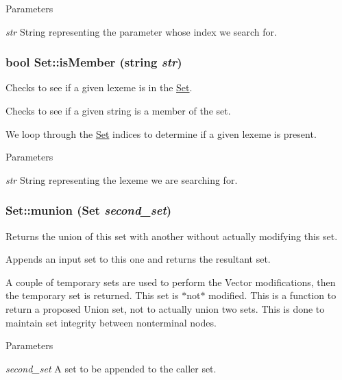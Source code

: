 \begin{DoxyParams}{Parameters}
\item[{\em str}]String representing the parameter whose index we search for. \end{DoxyParams}
\hypertarget{classSet_a4f539b8baf5e31d8c79cae9381a9e8be}{
\subsubsection[{isMember}]{\setlength{\rightskip}{0pt plus 5cm}bool Set::isMember (string {\em str})}}
\label{classSet_a4f539b8baf5e31d8c79cae9381a9e8be}


Checks to see if a given lexeme is in the \hyperlink{classSet}{Set}. 

Checks to see if a given string is a member of the set.

We loop through the \hyperlink{classSet}{Set} indices to determine if a given lexeme is present.


\begin{DoxyParams}{Parameters}
\item[{\em str}]String representing the lexeme we are searching for. \end{DoxyParams}
\hypertarget{classSet_ad28bf0706c650cbb019ed16b258d1441}{
\subsubsection[{munion}]{ Set::munion ({\bf Set} {\em second\_\-set})}}
\label{classSet_ad28bf0706c650cbb019ed16b258d1441}


Returns the union of this set with another without actually modifying this set. 

Appends an input set to this one and returns the resultant set.

A couple of temporary sets are used to perform the Vector modifications, then the temporary set is returned. This set is $\ast$not$\ast$ modified. This is a function to return a proposed Union set, not to actually union two sets. This is done to maintain set integrity between nonterminal nodes.


\begin{DoxyParams}{Parameters}
\item[{\em second\_\-set}]A set to be appended to the caller set. \end{DoxyParams}


